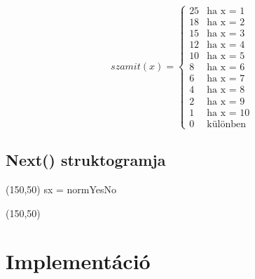 \documentclass[a4paper]{article}
\begin{document}
	\begin{flushright}
		\begin{equation*}
		szamit(x) =
		\begin{cases}
		25 & \text{ha x = 1} \\
		18 & \text{ha x = 2} \\
		15 & \text{ha x = 3} \\
		12 & \text{ha x = 4} \\
		10 & \text{ha x = 5} \\
		8 & \text{ha x = 6} \\
		6 & \text{ha x = 7} \\
		4 & \text{ha x = 8} \\
		2 & \text{ha x = 9} \\
		1 & \text{ha x = 10} \\
		0 & \text{különben}
		\end{cases}
		\end{equation*}
	\end{flushright}
	\subsection{Next() struktogramja}
	
	\begin{struktogramm}(150,50)
		 {sx = norm}{Yes}{No}
		\whileend
		\change
		\ifend
	\end{struktogramm}

	\begin{struktogramm}(150,50)
		\caseend

	\end{struktogramm}
\newpage
	\section{Implementáció}
\end{document}
